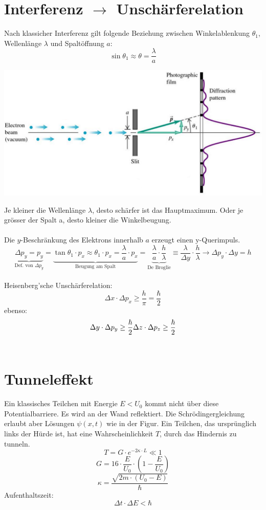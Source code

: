   \section{Interferenz $\rightarrow$ Unschärferelation}
  Nach klassicher Interferenz gilt folgende Beziehung zwischen Winkelablenkung $\theta_1$, Wellenlänge $\lambda$ und Spaltöffnung $a$:\
  \[
  		\sin\theta_1\approx \theta = \frac{\lambda}{a}
  \]
   \begin{center}
   	\includegraphics[scale = 0.2]{images/unschaerferelation.jpg}
   \end{center}
  Je kleiner die Wellenlänge $\lambda$, desto schärfer ist das Hauptmaximum. Oder je grösser der Spalt a, desto kleiner die Winkelbeugung.\\
  \\
  Die $y$-Beschränkung des Elektrons innerhalb $a$ erzeugt einen y-Querimpuls.
  \[
  		\underbrace{\Delta p_y=p_y}_{\text{Def. von $\Delta p_y$}}=
  		\underbrace{\tan\theta_1\cdot p_x \approx \theta_1\cdot p_x= \frac{\lambda}{a}\cdot p_x}_{\text{Beugung am Spalt}}=
  		\underbrace{\frac{\lambda}{a}\cdot\frac{h}{\lambda}}_{\text{De Broglie}}\equiv
  		\frac{\lambda}{\Delta y}\cdot\frac{h}{\lambda}
  		\rightarrow \Delta p_y\cdot\Delta y = h
  \]
\\
Heisenberg'sche Unschärferelation:
\[
	\Delta x \cdot \Delta p_x \geq \frac{h}{\pi}= \frac{\hbar}{2}	
\]
ebenso:
\[
	\Delta y \cdot \Delta p_y \geq \frac{\hbar}{2}	\\ \Delta z \cdot \Delta p_z \geq \frac{\hbar}{2} \\ \\
\]
\
\\
\section{Tunneleffekt}
Ein klassisches Teilchen mit Energie $E<U_0$ kommt nicht über diese Potentialbarriere. Es wird an der Wand reflektiert. Die Schrödingergleichung erlaubt aber Lösungen $\psi(x,t)$ wie in der Figur. Ein Teilchen, das ursprünglich links der Hürde ist, hat eine Wahrscheinlichkeit $T$, durch das Hindernis zu tunneln.\
\\
\[
	T=G\cdot e^{-2\kappa\cdot L}\ll 1
\]
\[
	G=16\cdot \frac{E}{U_0}\cdot \left( 1-\frac{E}{U_0}\right) 
\]
\[
	\kappa = \frac{\sqrt{2m\cdot\left( U_0-E  \right) }}{\hbar}
\]
Aufenthaltszeit:
\[
	\Delta t \cdot \Delta E < \hbar
\]
\
\\
